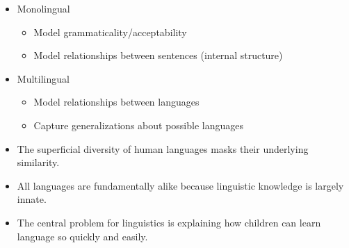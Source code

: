 \documentclass[a4paper,landscape,headrule,footrule]{foils}
\begin{document}
\begin{itemize}
\item Monolingual
\begin{itemize}
\item Model grammaticality/acceptability
\item Model relationships between sentences
(internal structure)
\end{itemize}
\item Multilingual
\begin{itemize}
\item Model relationships between languages
\item Capture generalizations about possible
languages
\end{itemize}
\end{itemize}

\begin{itemize}
\item The superficial diversity of human languages
masks their underlying similarity.
\item All languages are fundamentally alike
because linguistic knowledge is largely
innate.
\item The central problem for linguistics is
explaining how children can learn language
so quickly and easily.
\end{itemize}


\newcommand{\gr}[2]{#1  (#2)}

\end{document}
